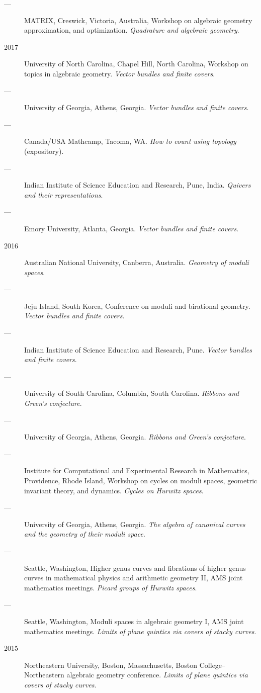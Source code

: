 \documentclass[11pt]{article}
\begin{document}
\begin{description}
\item[{---}] MATRIX, Creswick, Victoria, Australia, Workshop on algebraic geometry approximation, and optimization. \emph{Quadrature and algebraic geometry}.
\item[{2017}] University of North Carolina, Chapel Hill, North Carolina, Workshop on topics in algebraic geometry. \emph{Vector bundles and finite covers}.
\item[{---}] University of Georgia, Athens, Georgia. \emph{Vector bundles and finite covers}.
\item[{---}] Canada/USA Mathcamp, Tacoma, WA. \emph{How to count using topology} (expository).
\item[{---}] Indian Institute of Science Education and Research, Pune, India. \emph{Quivers and their representations}.
\item[{---}] Emory University, Atlanta, Georgia. \emph{Vector bundles and finite covers}.
\item[{2016}] Australian National University, Canberra, Australia. \emph{Geometry of moduli spaces}.
\item[{---}] Jeju Island, South Korea, Conference on moduli and birational geometry. \emph{Vector bundles and finite covers}.
\item[{---}] Indian Institute of Science Education and Research, Pune. \emph{Vector bundles and finite covers}.
\item[{---}] University of South Carolina, Columbia, South Carolina. \emph{Ribbons and Green's conjecture}.
\item[{---}] University of Georgia, Athens, Georgia. \emph{Ribbons and Green's conjecture}.
\item[{---}] Institute for Computational and Experimental Research in Mathematics, Providence, Rhode Island, Workshop on cycles on moduli spaces, geometric invariant theory, and dynamics. \emph{Cycles on Hurwitz spaces}.
\item[{---}] University of Georgia, Athens, Georgia. \emph{The algebra of canonical curves and the geometry of their moduli space}.
\item[{---}] Seattle, Washington, Higher genus curves and fibrations of higher genus curves in mathematical physics and arithmetic geometry II, AMS joint mathematics meetings. \emph{Picard groups of Hurwitz spaces}.
\item[{---}] Seattle, Washington, Moduli spaces in algebraic geometry I, AMS joint mathematics meetings. \emph{Limits of plane quintics via covers of stacky curves}.
\item[{2015}] Northeastern University, Boston, Massachusetts, Boston College--Northeastern algebraic geometry conference. \emph{Limits of plane quintics via covers of stacky curves}.

\end{description}
\end{document}
